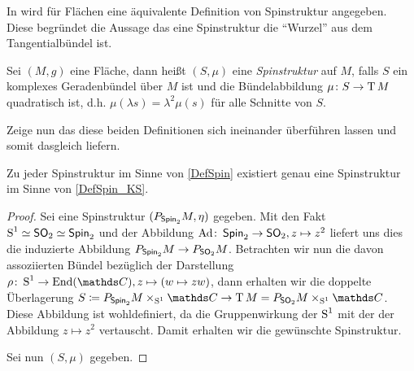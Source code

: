 In \cite{KS96} wird für Flächen eine äquivalente Definition
von Spinstruktur angegeben. Diese begründet die Aussage das
eine Spinstruktur die \enquote{Wurzel} aus dem Tangentialbündel ist.

\begin{Def}\label{DefSpin_KS}
	Sei $ (M,g) $ eine Fläche, dann heißt $ (S,\mu) $ eine
	\textit{Spinstruktur} auf $ M $, falls $ S $ ein komplexes Geradenbündel
	über $ M $ ist und die Bündelabbildung $ \abb{\mu}{S}{\T M} $ quadratisch	ist, d.h. $ \mu(\lambda s) = \lambda^2 \mu(s) $ für alle Schnitte
	von $ S $.
\end{Def}

Zeige nun das diese beiden Definitionen sich ineinander überführen
lassen und somit dasgleich liefern.

\begin{Satz}
	Zu jeder Spinstruktur im Sinne von \cref{DefSpin} existiert
	genau eine Spinstruktur im Sinne von \cref{DefSpin_KS}.
	\begin{proof}
		Sei eine Spinstruktur $ (\Ph{\spin_2}{M},\eta) $ gegeben.
		Mit den Fakt $ \S^1\simeq\so_2\simeq\spin_2 $ und der Abbildung
		$ \abb{\Ad}{\spin_2}{\so_2},z\mapsto z^2 $ liefert uns dies
		die induzierte Abbildung $ \Ph{\spin_2}{M}\rightarrow \Ph{\so_2}{M} $. Betrachten wir nun die davon assoziierten
		Bündel bezüglich der Darstellung $ \abb{\rho}{\S^1}{\End(\C)}, z\mapsto (w \mapsto zw) $, dann erhalten wir die doppelte
		Überlagerung $ S\coloneqq \Ph{\spin_2}{M}\times_{\S^1}\C \rightarrow {\T M = \Ph{\so_2}{M}\times_{\S^1}\C} $. Diese Abbildung ist wohldefiniert, da die Gruppenwirkung der $ \S^1 $ mit der
	    der Abbildung $ z\mapsto z^2 $ vertauscht. Damit erhalten
	    wir die gewünschte Spinstruktur.
	    
	    Sei nun $ (S,\mu) $ gegeben. 
	    
		
	\end{proof}
\end{Satz}



